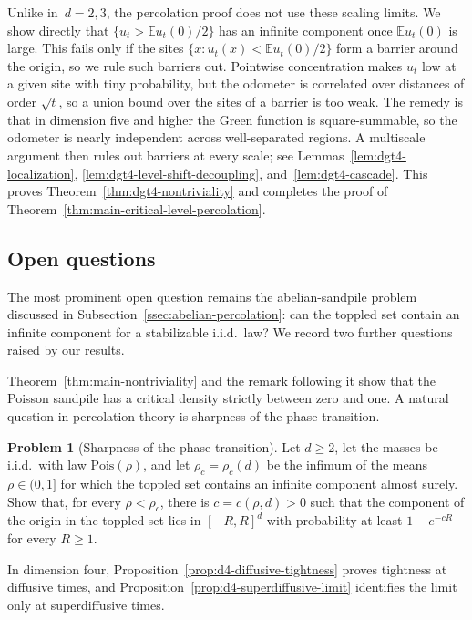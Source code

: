 \documentclass[11pt]{amsart}
\theoremstyle{plain}
\theoremstyle{definition}
\newtheorem{problem}[theorem]{Problem}
\newcommand{\E}{\mathbb{E}}
\begin{document}
Unlike in~$d=2,3$, the percolation proof does not use these scaling limits. We
show directly that $\{u_t>\E u_t(0)/2\}$ has an infinite component once
$\E u_t(0)$ is large. This fails only if the sites $\{x: u_t(x) < \E u_t(0)/2\}$ form a barrier around the origin, so we rule such barriers out.
Pointwise concentration makes $u_t$ low at a given site with tiny probability,
but the odometer is correlated over distances of order $\sqrt t$, so a union
bound over the sites of a barrier is too weak. The remedy is that in dimension
five and higher the Green function is square-summable, so the odometer is nearly
independent across well-separated regions. A multiscale argument then rules out
barriers at every scale; see Lemmas~\ref{lem:dgt4-localization},
\ref{lem:dgt4-level-shift-decoupling}, and~\ref{lem:dgt4-cascade}. This proves
Theorem~\ref{thm:dgt4-nontriviality} and completes the proof of
Theorem~\ref{thm:main-critical-level-percolation}.

\subsection{Open questions}\label{ssec:open-questions}

The most prominent open question remains the abelian-sandpile problem discussed in Subsection~\ref{ssec:abelian-percolation}: can the toppled set contain an infinite component for a stabilizable i.i.d.\ law? We record two further questions raised by our results.

Theorem~\ref{thm:main-nontriviality} and the remark following it show that the Poisson sandpile has a critical density strictly between zero and one.
A natural question in percolation theory is sharpness of the phase transition. 

\begin{problem}[Sharpness of the phase transition]\label{prob:sharpness}
Let $d\geq2$, let the masses be i.i.d.\ with law $\mathrm{Pois}(\rho)$, and let $\rho_c=\rho_c(d)$ be the infimum of the means $\rho\in(0,1]$ for which the toppled set contains an infinite component almost surely. Show that, for every $\rho<\rho_c$, there is $c=c(\rho,d)>0$ such that the component of the origin in the toppled set lies in $[-R,R]^d$ with probability at least $1-e^{-cR}$ for every $R\geq1$.
\end{problem}

In dimension four, Proposition~\ref{prop:d4-diffusive-tightness} proves tightness at
diffusive times, and Proposition~\ref{prop:d4-superdiffusive-limit}
identifies the limit only at superdiffusive times.
\end{document}
